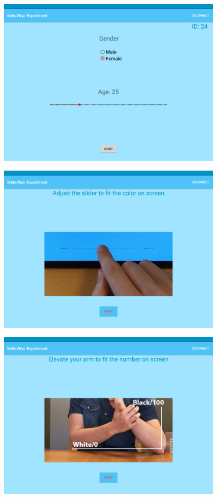\begin{figure}[h!]
    \centering
    \includegraphics[width=0.6\linewidth]{figures/tablet_screen5.png}
  \label{app_ex_start}
\end{figure}

\begin{figure}[h!]
    \centering
  \includegraphics[width=0.6\linewidth]{figures/tablet_screen6.png}
  \label{app_slider_explain}
\end{figure}


\begin{figure}[h!]
    \centering
    \includegraphics[width=0.6\linewidth]{figures/tablet_screen12.png}
  \label{app_arm_explain}
\end{figure}

